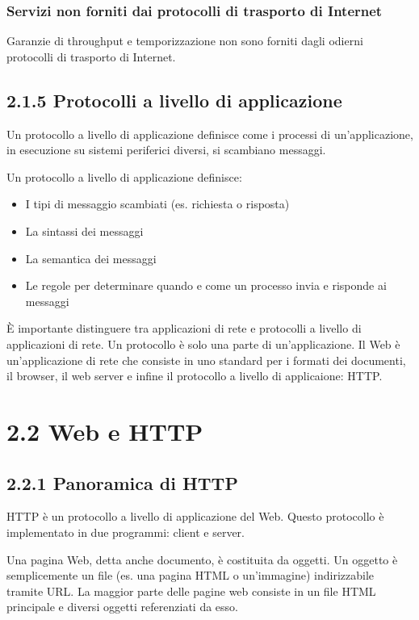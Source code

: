 \documentclass{book}
\begin{document}
\subsubsection*{Servizi non forniti dai protocolli di trasporto di Internet}
Garanzie di throughput e temporizzazione non sono forniti dagli odierni protocolli di trasporto di Internet.

\subsection*{2.1.5 Protocolli a livello di applicazione}
Un protocollo a livello di applicazione definisce come i processi di un'applicazione, in esecuzione su sistemi periferici diversi, si scambiano messaggi.

Un protocollo a livello di applicazione definisce:
\begin{itemize}
	\item I tipi di messaggio scambiati (es. richiesta o risposta)
	\item La sintassi dei messaggi
	\item La semantica dei messaggi
	\item Le regole per determinare quando e come un processo invia e risponde ai messaggi
\end{itemize}

È importante distinguere tra applicazioni di rete e protocolli a livello di applicazioni di rete. Un protocollo è solo una parte di un'applicazione. Il Web è un'applicazione di rete che consiste in uno standard per i formati dei documenti, il browser, il web server e infine il protocollo a livello di applicaione: HTTP.

\section*{2.2 Web e HTTP}
\subsection*{2.2.1 Panoramica di HTTP}
HTTP è un protocollo a livello di applicazione del Web. Questo protocollo è implementato in due programmi: client e server.

Una pagina Web, detta anche documento, è costituita da oggetti. Un oggetto è semplicemente un file (es. una pagina HTML o un'immagine) indirizzabile tramite URL. La maggior parte delle pagine web consiste in un file HTML principale e diversi oggetti referenziati da esso.
\end{document}
